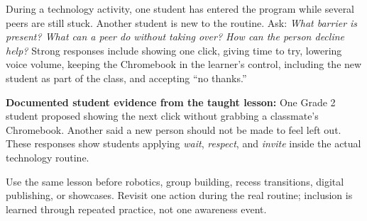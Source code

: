 During a technology activity, one student has entered the program while several peers are still stuck. Another student is new to the routine. Ask: \textit{What barrier is present? What can a peer do without taking over? How can the person decline help?} Strong responses include showing one click, giving time to try, lowering voice volume, keeping the Chromebook in the learner's control, including the new student as part of the class, and accepting ``no thanks.''

\begin{center}
\colorbox{SoftGreen}{\parbox{0.93\textwidth}{\small
\textbf{Documented student evidence from the taught lesson:} One Grade 2 student proposed showing the next click without grabbing a classmate's Chromebook. Another said a new person should not be made to feel left out. These responses show students applying \textit{wait}, \textit{respect}, and \textit{invite} inside the actual technology routine.
}}
\end{center}

Use the same lesson before robotics, group building, recess transitions, digital publishing, or showcases. Revisit one action during the real routine; inclusion is learned through repeated practice, not one awareness event.



